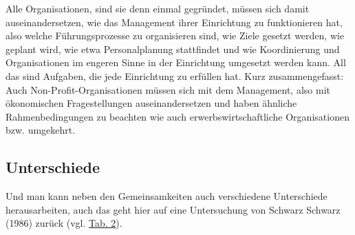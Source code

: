 \documentclass[
  letterpaper,
]{book}
\begin{document}
Alle Organisationen, sind sie denn einmal gegründet, müssen sich damit
auseinandersetzen, wie das Management ihrer Einrichtung zu funktionieren
hat, also welche Führungsprozesse zu organisieren sind, wie Ziele
gesetzt werden, wie geplant wird, wie etwa Personalplanung stattfindet
und wie Koordinierung und Organisationen im engeren Sinne in der
Einrichtung umgesetzt werden kann. All das sind Aufgaben, die jede
Einrichtung zu erfüllen hat. Kurz zusammengefasst: Auch
Non-Profit-Organisationen müssen sich mit dem Management, also mit
ökonomischen Fragestellungen auseinandersetzen und haben ähnliche
Rahmenbedingungen zu beachten wie auch erwerbswirtschaftliche
Organisationen bzw. umgekehrt.

\subsection{Unterschiede}\label{npounterschiede}

Und man kann neben den Gemeinsamkeiten auch verschiedene Unterschiede
herausarbeiten, auch das geht hier auf eine Untersuchung von Schwarz
Schwarz (1986) zurück (vgl. \hyperref[table2]{Tab. 2}).
\end{document}
